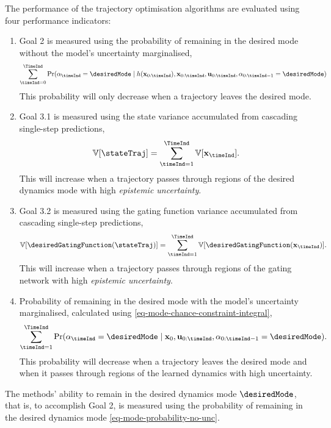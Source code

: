 \documentclass{mimosis-class/mimosis}
\numberwithin{equation}{chapter}
\newcommand{\state}{\ensuremath{\mathbf{x}}}
\newcommand{\control}{\ensuremath{\mathbf{u}}}
\newcommand{\modeVar}{\ensuremath{\alpha}}
\newcommand{\gatingFunc}{\ensuremath{h}}
\begin{document}
{The performance of the trajectory optimisation algorithms are evaluated
using four performance indicators:
\begin{enumerate}
\item Goal 2 is measured using the probability of remaining in the desired mode without the model's uncertainty marginalised,
\begin{align} \label{eq-mode-probability-no-unc}
\sum_{\timeInd=0}^{\TimeInd} \Pr(\modeVar_\timeInd=\desiredMode \mid \gatingFunc(\state_{0:\timeInd}), \state_{0:\timeInd}, \control_{0:\timeInd}, \modeVar_{0:\timeInd-1}=\desiredMode)
\end{align}
This probability will only decrease when a trajectory leaves the desired mode.
\item Goal 3.1 is measured using the state variance accumulated from cascading single-step predictions,
\begin{align} \label{eq-metric-state-var}
\mathbb{V}[\stateTraj] = \sum_{\timeInd=1}^{\TimeInd} \mathbb{V}[\state_{\timeInd}].
\end{align}
This will increase when a trajectory passes through regions of the desired dynamics mode with high \emph{epistemic uncertainty}.
\item Goal 3.2 is measured using the gating function variance accumulated from cascading single-step predictions,
\begin{align} \label{eq-metric-gating-var}
\mathbb{V}[\desiredGatingFunction(\stateTraj)] = \sum_{\timeInd=1}^{\TimeInd}
\mathbb{V}[\desiredGatingFunction(\state_{\timeInd})].
\end{align}
This will increase when a trajectory passes through regions of the gating network with high \emph{epistemic uncertainty}.
\item Probability of remaining in the desired mode with the model's uncertainty marginalised,
calculated using \cref{eq-mode-chance-constraint-integral},
\begin{align} \label{eq-mode-probability-all-unc}
\sum_{\timeInd=1}^{\TimeInd}
\Pr(\modeVar_\timeInd=\desiredMode \mid \state_0, \control_{0:\timeInd}, \modeVar_{0:\timeInd-1}=\desiredMode).
\end{align}
This probability will decrease when a trajectory leaves the desired mode and when it
passes through regions of the learned dynamics with high uncertainty.
\end{enumerate}
The methods' ability to remain in the desired dynamics mode \(\desiredMode\), that is, to accomplish Goal 2,
is measured using the probability of remaining in the desired dynamics mode \cref{eq-mode-probability-no-unc}.
}
\end{document}
